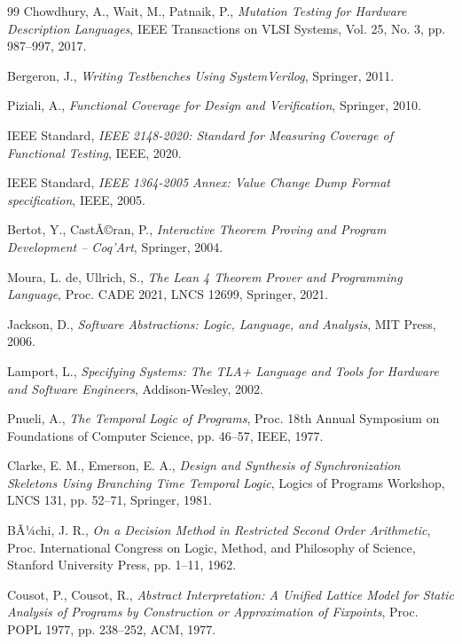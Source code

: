 ﻿\documentclass[12pt,a4paper]{report}
\begin{document}
\begin{thebibliography}{99}
  Chowdhury, A., Wait, M., Patnaik, P.,
  \textit{Mutation Testing for Hardware Description Languages},
  IEEE Transactions on VLSI Systems, Vol. 25, No. 3, pp. 987--997, 2017.

  Bergeron, J.,
  \textit{Writing Testbenches Using SystemVerilog},
  Springer, 2011.

  Piziali, A.,
  \textit{Functional Coverage for Design and Verification},
  Springer, 2010.

  IEEE Standard,
  \textit{IEEE 2148-2020: Standard for Measuring Coverage of Functional Testing},
  IEEE, 2020.

  IEEE Standard,
  \textit{IEEE 1364-2005 Annex: Value Change Dump Format specification},
  IEEE, 2005.

  Bertot, Y., CastÃ©ran, P.,
  \textit{Interactive Theorem Proving and Program Development -- Coq'Art},
  Springer, 2004.

  Moura, L. de, Ullrich, S.,
  \textit{The Lean 4 Theorem Prover and Programming Language},
  Proc. CADE 2021, LNCS 12699, Springer, 2021.

  Jackson, D.,
  \textit{Software Abstractions: Logic, Language, and Analysis},
  MIT Press, 2006.

  Lamport, L.,
  \textit{Specifying Systems: The TLA+ Language and Tools for Hardware and Software Engineers},
  Addison-Wesley, 2002.

  Pnueli, A.,
  \textit{The Temporal Logic of Programs},
  Proc. 18th Annual Symposium on Foundations of Computer Science,
  pp. 46--57, IEEE, 1977.

  Clarke, E. M., Emerson, E. A.,
  \textit{Design and Synthesis of Synchronization Skeletons Using Branching Time Temporal Logic},
  Logics of Programs Workshop, LNCS 131, pp. 52--71, Springer, 1981.

  BÃ¼chi, J. R.,
  \textit{On a Decision Method in Restricted Second Order Arithmetic},
  Proc. International Congress on Logic, Method, and Philosophy of Science,
  Stanford University Press, pp. 1--11, 1962.

  Cousot, P., Cousot, R.,
  \textit{Abstract Interpretation: A Unified Lattice Model for Static Analysis of Programs
  by Construction or Approximation of Fixpoints},
  Proc. POPL 1977, pp. 238--252, ACM, 1977.


\end{thebibliography}
\end{document}

